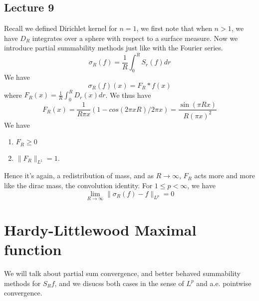 \section{Lecture 9}
Recall we defined Dirichlet kernel for $n=1$, we first note that when $n>1$, we have $D_R$ integrates over a sphere with respect to a surface measure. Now we introduce partial summability methods just like with the Fourier series.
\begin{equation*}
    \sigma_R(f)=\frac{1}{R}\int_0^R S_r(f)dr
\end{equation*}
We have
\begin{equation*}
    \sigma_R(f)(x)=F_R\ast f(x)
\end{equation*}
where $F_R(x)=\frac{1}{R}\int_0^RD_r(x)dr$. 
We thus have
\begin{equation*}
    F_R(x)=\frac{1}{R\pi x}(1-cos(2\pi xR)/2\pi x)=\frac{\sin(\pi Rx)}{R(\pi x)^2}
\end{equation*}
We have
\begin{enumerate}
    \item $F_R\geq 0$
    \item $\|F_R\|_{L^1}=1$.
\end{enumerate}
Hence it's again, a redistribution of mass, and as $R\to\infty$, $F_R$ acts more and more like the dirac mass, the convolution identity. For $1\leq p<\infty$, we have
\begin{equation*}
    \lim_{R\to\infty}\|\sigma_R(f)-f\|_{L^p}=0
\end{equation*}

\chapter{Hardy-Littlewood Maximal function}
We will talk about partial sum convergence, and better behaved summability methods for $S_Rf$, and we disucss both cases in the sense of $L^p$ and a.e. pointwise convergence.

